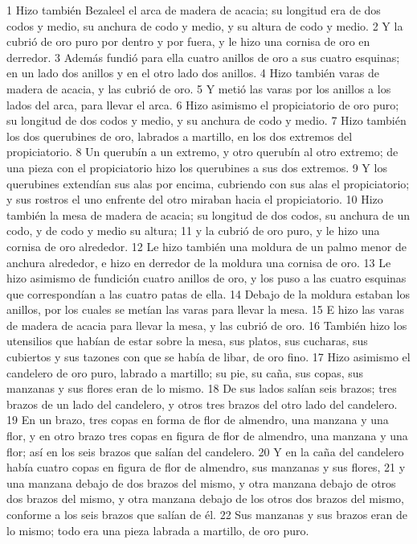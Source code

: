 1 Hizo también Bezaleel el arca de madera de acacia; su longitud era de dos codos y medio, su anchura de codo y medio, y su altura de codo y medio.
2 Y la cubrió de oro puro por dentro y por fuera, y le hizo una cornisa de oro en derredor.
3 Además fundió para ella cuatro anillos de oro a sus cuatro esquinas; en un lado dos anillos y en el otro lado dos anillos.
4 Hizo también varas de madera de acacia, y las cubrió de oro.
5 Y metió las varas por los anillos a los lados del arca, para llevar el arca.
6 Hizo asimismo el propiciatorio de oro puro; su longitud de dos codos y medio, y su anchura de codo y medio.
7 Hizo también los dos querubines de oro, labrados a martillo, en los dos extremos del propiciatorio.
8 Un querubín a un extremo, y otro querubín al otro extremo; de una pieza con el propiciatorio hizo los querubines a sus dos extremos.
9 Y los querubines extendían sus alas por encima, cubriendo con sus alas el propiciatorio; y sus rostros el uno enfrente del otro miraban hacia el propiciatorio.
10 Hizo también la mesa de madera de acacia; su longitud de dos codos, su anchura de un codo, y de codo y medio su altura;
11 y la cubrió de oro puro, y le hizo una cornisa de oro alrededor.
12 Le hizo también una moldura de un palmo menor   de anchura alrededor, e hizo en derredor de la moldura una cornisa de oro.
13 Le hizo asimismo de fundición cuatro anillos de oro, y los puso a las cuatro esquinas que correspondían a las cuatro patas de ella.
14 Debajo de la moldura estaban los anillos, por los cuales se metían las varas para llevar la mesa.
15 E hizo las varas de madera de acacia para llevar la mesa, y las cubrió de oro.
16 También hizo los utensilios que habían de estar sobre la mesa, sus platos, sus cucharas, sus cubiertos y sus tazones con que se había de libar, de oro fino.
17 Hizo asimismo el candelero de oro puro, labrado a martillo; su pie, su caña, sus copas, sus manzanas y sus flores eran de lo mismo.
18 De sus lados salían seis brazos; tres brazos de un lado del candelero, y otros tres brazos del otro lado del candelero.
19 En un brazo, tres copas en forma de flor de almendro, una manzana y una flor, y en otro brazo tres copas en figura de flor de almendro, una manzana y una flor; así en los seis brazos que salían del candelero.
20 Y en la caña del candelero había cuatro copas en figura de flor de almendro, sus manzanas y sus flores,
21 y una manzana debajo de dos brazos del mismo, y otra manzana debajo de otros dos brazos del mismo, y otra manzana debajo de los otros dos brazos del mismo, conforme a los seis brazos que salían de él.
22 Sus manzanas y sus brazos eran de lo mismo; todo era una pieza labrada a martillo, de oro puro.
